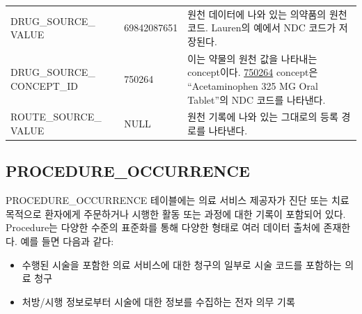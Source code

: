 \documentclass[10.5pt]{book}
\providecommand{\tightlist}{%
  \setlength{\itemsep}{0pt}\setlength{\parskip}{0pt}}
\theoremstyle{definition}
\theoremstyle{definition}
\theoremstyle{definition}
\theoremstyle{remark}
\begin{document}
\begin{longtable}[]{@{}lll@{}}
\begin{minipage}[t]{0.28\columnwidth}\raggedright\strut
DRUG\_SOURCE\_ VALUE\strut
\end{minipage} & \begin{minipage}[t]{0.16\columnwidth}\raggedright\strut
69842087651\strut
\end{minipage} & \begin{minipage}[t]{0.48\columnwidth}\raggedright\strut
원천 데이터에 나와 있는 의약품의 원천 코드. Lauren의 예에서 NDC 코드가
저장된다.\strut
\end{minipage}\tabularnewline
\begin{minipage}[t]{0.28\columnwidth}\raggedright\strut
DRUG\_SOURCE\_ CONCEPT\_ID\strut
\end{minipage} & \begin{minipage}[t]{0.16\columnwidth}\raggedright\strut
750264\strut
\end{minipage} & \begin{minipage}[t]{0.48\columnwidth}\raggedright\strut
이는 약물의 원천 값을 나타내는 concept이다.
\href{http://athena.ohdsi.org/search-terms/terms/750264}{750264}
concept은 ``Acetaminophen 325 MG Oral Tablet''의 NDC 코드를
나타낸다.\strut
\end{minipage}\tabularnewline
\begin{minipage}[t]{0.28\columnwidth}\raggedright\strut
ROUTE\_SOURCE\_ VALUE\strut
\end{minipage} & \begin{minipage}[t]{0.16\columnwidth}\raggedright\strut
NULL\strut
\end{minipage} & \begin{minipage}[t]{0.48\columnwidth}\raggedright\strut
원천 기록에 나와 있는 그대로의 등록 경로를 나타낸다.\strut
\end{minipage}\tabularnewline
\bottomrule
\end{longtable}

\subsection{PROCEDURE\_OCCURRENCE}\label{procedureOccurrence}

PROCEDURE\_OCCURRENCE 테이블에는 의료 서비스 제공자가 진단 또는 치료
목적으로 환자에게 주문하거나 시행한 활동 또는 과정에 대한 기록이
포함되어 있다. Procedure는 다양한 수준의 표준화를 통해 다양한 형태로
여러 데이터 출처에 존재한다. 예를 들면 다음과 같다:

\begin{itemize}
\tightlist
\item
  수행된 시술을 포함한 의료 서비스에 대한 청구의 일부로 시술 코드를
  포함하는 의료 청구
\item
  처방/시행 정보로부터 시술에 대한 정보를 수집하는 전자 의무 기록
\end{itemize}
\end{document}
